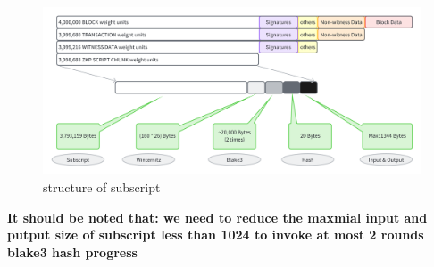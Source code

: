 \begin{figure}[ht] 
    \centering  
    \includegraphics[width=0.85\columnwidth]{images/structure-of-subscript.png} 
    \caption{structure of subscript}
    \label{fig:structure of subscript}
\end{figure}

\textbf{It should be noted that: we need to reduce the maxmial input and putput size of subscript less than 1024 to invoke at most 2 rounds blake3 \cite{website:blake3} hash progress}

